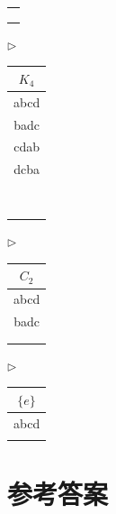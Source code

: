 \documentclass[b5paper]{ctexart}
\begin{document}
\begin{center}
\begin{tabular}[t]{|c|}
\\
\\
\\
\\
\hline
\end{tabular}
\parbox[t]{3mm}{\vspace{2mm} $\rhd$}
\begin{tabular}[t]{|c|}
\hline
$K_4$ \\
\hline
abcd \\
badc \\
cdab \\
dcba \\
\hline
\\
\\
\\
\\
\hline
\\
\\
\\
\\
\hline
\end{tabular}
\parbox[t]{3mm}{\vspace{2mm} $\rhd$}
\begin{tabular}[t]{|c|}
\hline
$C_2$ \\
\hline
abcd \\
badc \\
\hline
\\
\\
\hline
\end{tabular}
\parbox[t]{3mm}{\vspace{2mm} $\rhd$}
\begin{tabular}[t]{|c|}
\hline
$\{e\}$ \\
\hline
abcd \\
\hline
\\
\hline
\end{tabular}
\end{center}

\ifx\wholebook\relax \else
\section{参考答案}
\shipoutAnswer
\end{document}
